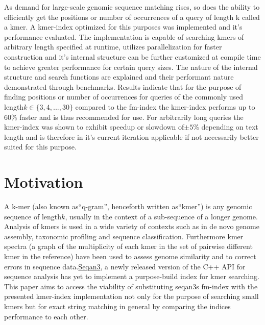 \begin{abstractDE}
As demand for large-scale genomic sequence matching rises, so does
the ability to efficiently get the positions or number of occurrences
of a query of length k called a kmer. A kmer-index optimized for this
purposes was implemented and it's performance evaluated. The implementation
is capable of searching kmers of arbitrary length specified at runtime,
utilizes parallelization for faster construction and it's internal
structure can be further customized at compile time to achieve greater
performance for certain query sizes. The nature of the internal structure
and search functions are explained and their performant nature demonstrated
through benchmarks. Results indicate that for the purpose of finding
positions or number of occurrences for queries of the commonly used
length$k\in\{3,4,...,30\}$ compared to the fm-index the kmer-index
performs up to 60\% faster and is thus recommended for use. For arbitrarily
long queries the kmer-index was shown to exhibit speedup or slowdown
of$\pm5$\% depending on text length and is therefore in it's current
iteration applicable if not necessarily better suited for this purpose.
\end{abstractDE}
\vfill

\thispagestyle{empty}

\tableofcontents{}

\pagebreak{}

\setcounter{page}{1}

\section{Motivation}

A k-mer (also known as``q-gram'', henceforth written as``kmer'')
is any genomic sequence of length$k$, usually in the context of a
sub-sequence of a longer genome. Analysis of kmers is used in a wide
variety of contexts such as in de novo genome assembly\cite{SOAPdenovo},
taxonomic profiling\cite{phenotype:classification:with:kmer:spectrum} and sequence
classification\cite{kraken:sequence:classification}. Furthermore kmer spectra (a
graph of the multiplicity of each kmer in the set of pairwise different
kmer in the reference) have been used to assess genome similarity\cite{kmer:spectrum:dissimilarity}
and to correct errors in sequence data\cite{musket:kmer:spectrum:error:correction}.\href{https://github.com/seqan/seqan3}{Seqan3},
a newly released version of the C++ API for sequence analysis has
yet to implement a purpose-build index for kmer searching. This paper
aims to access the viability of substituting seqan3s fm-index\cite{fm:index:master:thesis}
with the presented kmer-index implementation not only for the purpose
of searching small kmers but for exact string matching in general
by comparing the indices performance to each other.

